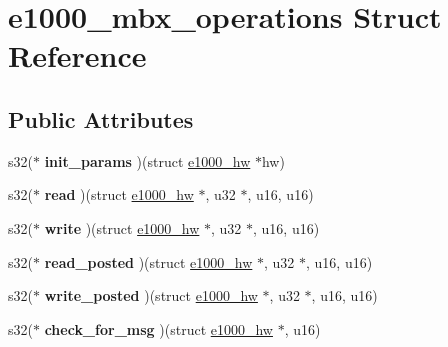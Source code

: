 \hypertarget{structe1000__mbx__operations}{
\section{e1000\_\-mbx\_\-operations Struct Reference}
\label{structe1000__mbx__operations}
}
\subsection*{Public Attributes}
\begin{DoxyCompactItemize}
\item 
\hypertarget{structe1000__mbx__operations_a4ab88e80e66aaa022968046f86787963}{
s32($\ast$ {\bfseries init\_\-params} )(struct \hyperlink{structe1000__hw}{e1000\_\-hw} $\ast$hw)}
\label{structe1000__mbx__operations_a4ab88e80e66aaa022968046f86787963}

\item 
\hypertarget{structe1000__mbx__operations_abdfa2fdae5d1f41f3981671e152f9360}{
s32($\ast$ {\bfseries read} )(struct \hyperlink{structe1000__hw}{e1000\_\-hw} $\ast$, u32 $\ast$, u16, u16)}
\label{structe1000__mbx__operations_abdfa2fdae5d1f41f3981671e152f9360}

\item 
\hypertarget{structe1000__mbx__operations_a6f6779f19a457b2993ae5568e292ffc0}{
s32($\ast$ {\bfseries write} )(struct \hyperlink{structe1000__hw}{e1000\_\-hw} $\ast$, u32 $\ast$, u16, u16)}
\label{structe1000__mbx__operations_a6f6779f19a457b2993ae5568e292ffc0}

\item 
\hypertarget{structe1000__mbx__operations_af2eccdaece62231848cf6ab50253848a}{
s32($\ast$ {\bfseries read\_\-posted} )(struct \hyperlink{structe1000__hw}{e1000\_\-hw} $\ast$, u32 $\ast$, u16, u16)}
\label{structe1000__mbx__operations_af2eccdaece62231848cf6ab50253848a}

\item 
\hypertarget{structe1000__mbx__operations_a5b1594fc054933c57eaedef3e2168706}{
s32($\ast$ {\bfseries write\_\-posted} )(struct \hyperlink{structe1000__hw}{e1000\_\-hw} $\ast$, u32 $\ast$, u16, u16)}
\label{structe1000__mbx__operations_a5b1594fc054933c57eaedef3e2168706}

\item 
\hypertarget{structe1000__mbx__operations_a86b18705cdeeaa6b403da3316f2188ba}{
s32($\ast$ {\bfseries check\_\-for\_\-msg} )(struct \hyperlink{structe1000__hw}{e1000\_\-hw} $\ast$, u16)}
\label{structe1000__mbx__operations_a86b18705cdeeaa6b403da3316f2188ba}


\end{DoxyCompactItemize}
